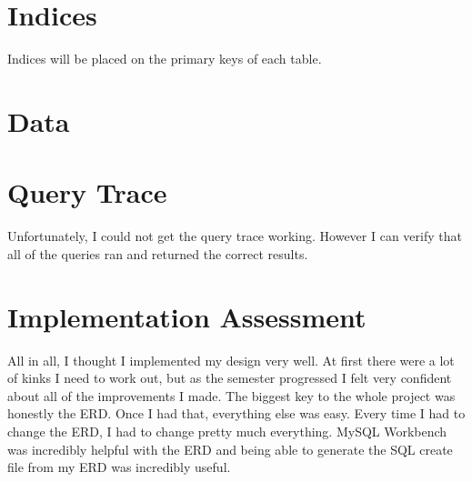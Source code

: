 \documentclass[11pt, a4paper]{report}
\begin{document}
\section{Indices}
Indices will be placed on the primary keys of each table.
\section{Data}

\section{Query Trace}
Unfortunately, I could not get the query trace working. However I can verify that all of the queries ran and returned the correct results.

\section{Implementation Assessment}
All in all, I thought I implemented my design very well. At first there were a lot of kinks I need to work out, but as the semester progressed I felt very confident about all of the improvements I made. The biggest key to the whole project was honestly the ERD. Once I had that, everything else was easy. Every time I had to change the ERD, I had to change pretty much everything. MySQL Workbench was incredibly helpful with the ERD and being able to generate the SQL create file from my ERD was incredibly useful.
\end{document}
